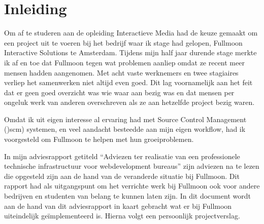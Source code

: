 \chapter{Inleiding}

Om af te studeren aan de opleiding Interactieve Media had de keuze gemaakt om een project uit te voeren bij het bedrijf waar ik stage had gelopen, Fullmoon Interactive Solutions te Amsterdam. Tijdens mijn half jaar durende stage merkte ik af en toe dat Fullmoon tegen wat problemen aanliep omdat ze recent meer mensen hadden aangenomen. Met acht vaste werknemers en twee stagiaires verliep het samenwerken niet altijd even goed. Dit lag voornamelijk aan het feit dat er geen goed overzicht was wie waar aan bezig was en dat mensen per ongeluk werk van anderen overschreven als ze aan hetzelfde project bezig waren.

Omdat ik uit eigen interesse al ervaring had met Source Control Management (){\sc scm}) systemen, en veel aandacht besteedde aan mijn eigen workflow, had ik voorgesteld om Fullmoon te helpen met hun groeiproblemen.

In mijn adviesrapport getiteld ``Adviezen ter realisatie van een professionele technische infrastructuur voor webdevelopment bureaus'' zijn adviezen na te lezen die opgesteld zijn aan de hand van de veranderde situatie bij Fullmoon. Dit rapport had als uitgangspunt om het verrichte werk bij Fullmoon ook voor andere bedrijven en studenten van belang te kunnen laten zijn. In dit document wordt aan de hand van dit adviesrapport in kaart gebracht wat er bij Fullmoon uiteindelijk geïmplementeerd is. Hierna volgt een persoonlijk projectverslag.
